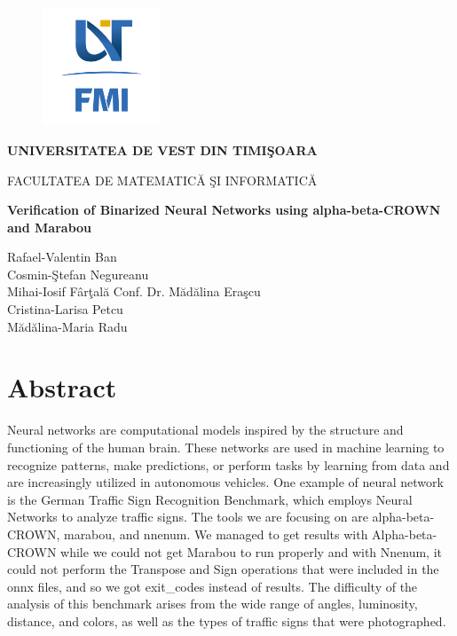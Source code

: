 \documentclass[12pt,a4paper]{report}
\begin{document}
\thispagestyle{empty}
\begin{center}
\begin{figure}[h!]
\vspace{-20pt}
\begin{center}
\includegraphics[width=100pt]{FMI-03.png}
\end{center}
\end{figure}

{\large{\bf UNIVERSITATEA DE VEST DIN TIMI\c SOARA

FACULTATEA DE MATEMATIC\u A \c SI INFORMATIC\u A}}

\vspace{65pt}
{\huge {\bf Verification of Binarized Neural Networks using alpha-beta-CROWN and Marabou}}

\vspace{65pt}
\end{center}

\noindent Rafael-Valentin Ban\\
\noindent Cosmin-\c Stefan Negureanu\\
\noindent Mihai-Iosif F\^{a}r\c tal\u a \hfill Conf. Dr. M\u ad\u alina Era\c scu\\
\noindent Cristina-Larisa Petcu\\
\noindent M\u ad\u alina-Maria Radu\\


\newpage
\section*{Abstract}
Neural networks are computational models inspired by the structure and functioning of the human brain. These networks are used in machine learning to recognize patterns, make predictions, or perform tasks by learning from data and are increasingly utilized in autonomous vehicles. 
One  example of  neural network is the German Traffic Sign Recognition Benchmark, which employs Neural Networks to analyze traffic signs. The tools we are focusing on are alpha-beta-CROWN, marabou, and nnenum. We managed to get results with Alpha-beta-CROWN while we could not  get Marabou to run properly and with Nnenum, it could not perform the Transpose and Sign operations that were included in the onnx files, and so we got exit_codes instead of results.  The difficulty of the analysis of this benchmark arises from the wide range of angles, luminosity, distance, and colors, as well as the types of traffic signs that were photographed. 
\end{document}
